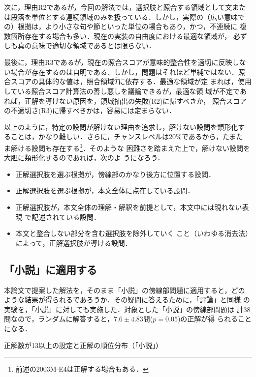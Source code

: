 \documentclass[japanese]{jnlp_1.4}
\begin{document}
次に，理由R2であるが，今回の解法では，選択肢と照合する領域として文また
は段落を単位とする連続領域のみを扱っている．しかし，実際の（広い意味で
の）根拠は，より小さな句や節といった単位の場合もあり，かつ，不連続に
複数箇所存在する場合も多い．現在の実装の自由度における最適な領域が，
必ずしも真の意味で適切な領域であるとは限らない．

最後に，理由R3であるが，現在の照合スコアが意味的整合性を適切に反映しな
い場合が存在するのは自明である．しかし，問題はそれほど単純ではない．照
合スコアの具体的な値は，照合領域$\widehat{T}$に依存する．最適な領域が定
まれば，使用している照合スコア計算法の善し悪しを議論できるが，最適な領
域が不定であれば，正解を導けない原因を，領域抽出の失敗(R2)に帰すべきか，
照合スコアの不適切さ(R3)に帰すべきかは，容易には定まらない．

以上のように，特定の設問が解けない理由を追求し，解けない設問を類形化す
ることは，かなり難しい．さらに，チャンスレベルは20\%であるから，たまた
ま解ける設問も存在する\footnote{
前述の2003M-E4は正解する場合もある．
}．そのような
困難さを踏まえた上で，解けない設問を大胆に類形化するのであれば，次のよ
うになろう．
\begin{itemize}
\item 
正解選択肢を選ぶ根拠が，傍線部のかなり後方に位置する設問．
\item 
正解選択肢を選ぶ根拠が，本文全体に点在している設問．
\item
正解選択肢が，本文全体の理解・解釈を前提として，本文中には現れない表現
で記述されている設問．
\item 
本文と整合しない部分を含む選択肢を除外していく
こと（いわゆる消去法\cite{Itano2010}）によって，正解選択肢が導ける設問．
\end{itemize}


\subsection{「小説」に適用する}

本論文で提案した解法を，そのまま「小説」の傍線部問題に適用すると，どの
ような結果が得られるであろうか．その疑問に答えるために，「評論」と同様
の実験を，「小説」に対しても実施した．対象とした「小説」の傍線部問題は
計38問なので，ランダムに解答すると，$7.6\pm 4.83$問($p=0.05$)の正解が得
られることになる．

\begin{table}[b]
\caption{正解数が13以上の設定と正解の順位分布（「小説」）}
\label{table:novel}

\end{table}
\end{document}
